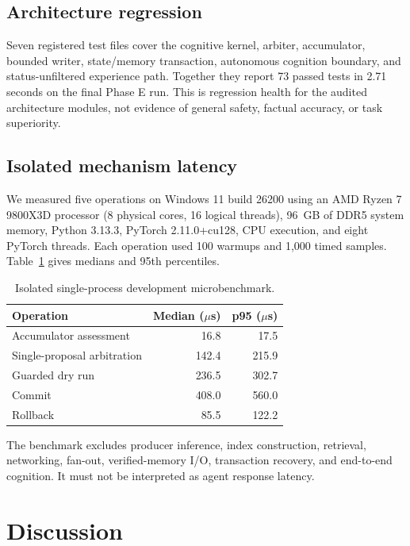 \documentclass[10pt]{article}
\begin{document}
\subsection{Architecture regression}

Seven registered test files cover the cognitive kernel, arbiter, accumulator, bounded writer, state/memory transaction, autonomous cognition boundary, and status-unfiltered experience path. Together they report 73 passed tests in 2.71 seconds on the final Phase E run. This is regression health for the audited architecture modules, not evidence of general safety, factual accuracy, or task superiority.

\subsection{Isolated mechanism latency}

We measured five operations on Windows 11 build 26200 using an AMD Ryzen 7 9800X3D processor (8 physical cores, 16 logical threads), 96~GB of DDR5 system memory, Python 3.13.3, PyTorch 2.11.0+cu128, CPU execution, and eight PyTorch threads. Each operation used 100 warmups and 1,000 timed samples. Table~\ref{tab:latency} gives medians and 95th percentiles.

\begin{table}[!htbp]
\centering
\small
\begin{tabular}{@{}lrr@{}}
\toprule
Operation & Median ($\mu$s) & p95 ($\mu$s) \\
\midrule
Accumulator assessment & 16.8 & 17.5 \\
Single-proposal arbitration & 142.4 & 215.9 \\
Guarded dry run & 236.5 & 302.7 \\
Commit & 408.0 & 560.0 \\
Rollback & 85.5 & 122.2 \\
\bottomrule
\end{tabular}
\caption{Isolated single-process development microbenchmark.}
\label{tab:latency}
\end{table}

The benchmark excludes producer inference, index construction, retrieval, networking, fan-out, verified-memory I/O, transaction recovery, and end-to-end cognition. It must not be interpreted as agent response latency.

\section{Discussion}
\end{document}
